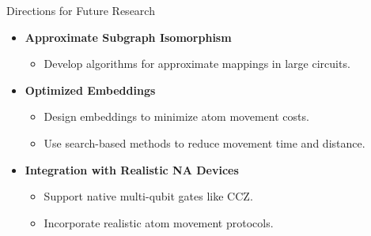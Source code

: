 \begin{frame}{Directions for Future Research}
    \begin{itemize}
        \item \textbf{Approximate Subgraph Isomorphism}
            \begin{itemize}
                \item Develop algorithms for approximate mappings in large circuits.
            \end{itemize}
        \item \textbf{Optimized Embeddings}
            \begin{itemize}
                \item Design embeddings to minimize atom movement costs.
                \item Use search-based methods to reduce movement time and distance.
            \end{itemize}
        \item \textbf{Integration with Realistic NA Devices}
            \begin{itemize}
                \item Support native multi-qubit gates like CCZ.
                \item Incorporate realistic atom movement protocols.
            \end{itemize}
    \end{itemize}
\end{frame}
